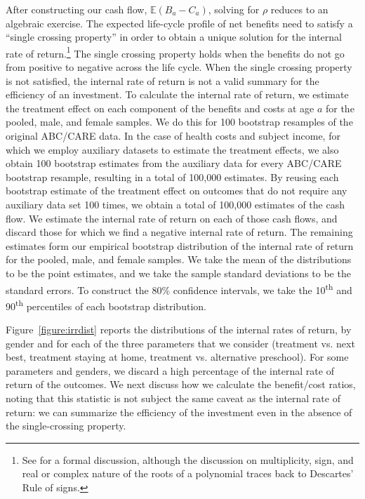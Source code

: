 \noindent After constructing our cash flow, $\mathbb{E} (B_a - C_a)$, solving for $\rho$ reduces to an algebraic exercise. The expected life-cycle profile of net benefits need to satisfy a ``single crossing property'' in order to obtain a unique solution for the internal rate of return.\footnote{See \citet{Arrow-Levhari_1969_EJ} for a formal discussion, although the discussion on multiplicity, sign, and real or complex nature of the roots of a polynomial traces back to Descartes' Rule of signs.} The single crossing property holds when the benefits do not go from positive to negative across the life cycle. When the single crossing property is not satisfied, the internal rate of return is not a valid summary for the efficiency of an investment. To calculate the internal rate of return, we estimate the treatment effect on each component of the benefits and costs at age $a$ for the pooled, male, and female samples. We do this for 100 bootstrap resamples of the original ABC/CARE data. In the case of health costs and subject income, for which we employ auxiliary datasets to estimate the treatment effects, we also obtain 100 bootstrap estimates from the auxiliary data for every ABC/CARE bootstrap resample, resulting in a total of 100,000 estimates. By reusing each bootstrap estimate of the treatment effect on outcomes that do not require any auxiliary data set 100 times, we obtain a total of 100,000 estimates of the cash flow. We estimate the internal rate of return on each of those cash flows, and discard those for which we find a negative internal rate of return. The remaining estimates form our empirical bootstrap distribution of the internal rate of return for the pooled, male, and female samples. We take the mean of the distributions to be the point estimates, and we take the sample standard deviations to be the standard errors. To construct the 80\% confidence intervals, we take the 10\textsuperscript{th} and 90\textsuperscript{th} percentiles of each bootstrap distribution.

\noindent Figure~\ref{figure:irrdist} reports the distributions of the internal rates of return, by gender and for each of the three parameters that we consider (treatment vs. next best, treatment staying at home, treatment vs. alternative preschool). For some parameters and genders, we discard a high percentage of the internal rate of return of the outcomes. We next discuss how we calculate the benefit/cost ratios, noting that this statistic is not subject the same caveat as the internal rate of return: we can summarize the efficiency of the investment even in the absence of the single-crossing property.

